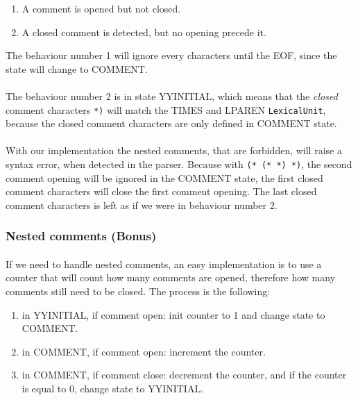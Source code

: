 \documentclass[letterpaper]{article}
\begin{document}
\begin{enumerate}
    \item A comment is opened but not closed.
    \item A closed comment is detected, but no opening precede it.
\end{enumerate}

The behaviour number 1 will ignore every characters until the EOF, since
the state will change to COMMENT.
\paragraph{}

The behaviour number 2 is in state YYINITIAL,
which means that the \textit{closed}
comment characters \texttt{*)} will match
the TIMES and LPAREN \texttt{LexicalUnit},
because the closed comment characters are only defined in COMMENT state.
\paragraph{}

With our implementation the nested comments, that are forbidden, will
raise a syntax error, when detected in the parser. Because with
\texttt{(* (* *) *)}, the second comment opening will be ignored in the
COMMENT state, the first closed comment characters will close the first comment
opening. The last closed comment characters is left as if we were in
behaviour number 2.

\subsubsection{Nested comments (Bonus)}

\paragraph{}
If we need to handle nested comments, an easy implementation is to use a
counter that will count how many comments are opened, therefore how many
comments still need to be closed. The process is the following:
\begin{enumerate}
    \item in YYINITIAL, if comment open: init counter to 1 and change state
    to COMMENT.
    \item in COMMENT, if comment open: increment the counter.
    \item in COMMENT, if comment close: decrement the counter, and
    if the counter is equal to 0, change state to YYINITIAL.
\end{enumerate}
\end{document}
